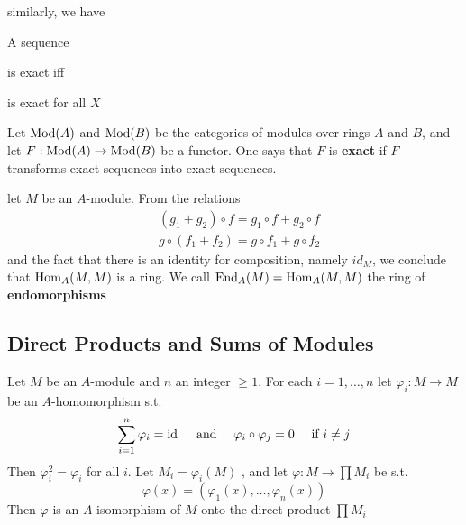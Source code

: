 \documentclass[11pt]{article}
\begin{document}
similarly, we have
\begin{proposition}[]
A sequence
\begin{center}\end{center}
is exact iff
\begin{center}\end{center}
is exact for all \(X\)
\end{proposition}

Let \(\operatorname{Mod}(A)\) and \(\operatorname{Mod}(B)\) be the categories of modules over rings \(A\) and \(B\), and
let \(F:\operatorname{Mod}(A)\to\operatorname{Mod}(B)\) be a functor. One says that \(F\) is \textbf{exact} if \(F\) transforms exact
sequences into exact sequences.

let \(M\) be an \(A\)-module. From the relations
\begin{align*}
&(g_1+g_2)\circ f=g_1\circ f+g_2\circ f\\
&g\circ(f_1+f_2)=g\circ f_1+g\circ f_2
\end{align*}
and the fact that there is an identity for composition, namely \(id_M\), we conclude
that \(\operatorname{Hom}_A(M,M)\) is a ring. We call \(\operatorname{End}_A(M)=\operatorname{Hom}_A(M,M)\) the ring of \textbf{endomorphisms}

\subsection{Direct Products and Sums of Modules}
\label{sec:org70042c0}
\begin{proposition}[]
Let \(M\) be an \(A\)-module and \(n\) an integer \(\ge 1\). For each \(i=1,\dots,n\) let \(\varphi_i:M\to M\)
be an \(A\)-homomorphism s.t.
\begin{equation*}
\sum_{i=1}^n\varphi_i=\operatorname{id} \quad\text{ and }\quad\varphi_i\circ\varphi_j=0\quad \text{ if }i\neq j
\end{equation*}
Then \(\varphi_i^2=\varphi_i\) for all \(i\). Let \(M_i=\varphi_i(M)\) , and let \(\varphi:M\to\prod M_i\) be s.t.
\begin{equation*}
\varphi(x)=(\varphi_1(x),\dots,\varphi_n(x))
\end{equation*}
Then \(\varphi\) is an \(A\)-isomorphism of \(M\) onto the direct product \(\prod M_i\)
\end{proposition}
\end{document}
